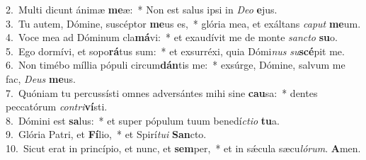 {2.~}Multi dicunt ánimæ \textbf{me}æ:~* Non est salus ipsi in \textit{De}\textit{o} \textbf{e}jus.\\
{3.~}Tu autem, Dómine, suscéptor \textbf{me}us es,~* glória mea, et exáltans \textit{ca}\textit{put} \textbf{me}um.\\
{4.~}Voce mea ad Dóminum cla\textbf{má}vi:~* et exaudívit me de monte \textit{san}\textit{cto} \textbf{su}o.\\
{5.~}Ego dormívi, et sopo\textbf{rá}tus sum:~* et exsurréxi, quia Dómi\textit{nus} \textit{su}\textbf{scé}pit me.\\
{6.~}Non timébo míllia pópuli circum\textbf{dán}tis me:~* exsúrge, Dómine, salvum me fac, \textit{De}\textit{us} \textbf{me}us.\\
{7.~}Quóniam tu percussísti omnes adversántes mihi sine \textbf{cau}sa:~* dentes peccatórum \textit{con}\textit{tri}\textbf{ví}sti.\\
{8.~}Dómini est \textbf{sa}lus:~* et super pópulum tuum benedí\textit{cti}\textit{o} \textbf{tu}a.\\
{9.~}Glória Patri, et \textbf{Fí}lio,~* et Spirí\textit{tu}\textit{i} \textbf{San}cto.\\
{10.~}Sicut erat in princípio, et nunc, et \textbf{sem}per,~* et in sǽcula sæcu\textit{ló}\textit{rum}. \textbf{A}men.\\

